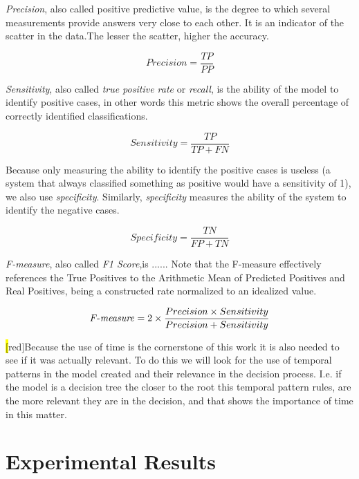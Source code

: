 \emph{Precision}, also called positive predictive value, is the degree to which several measurements provide answers very close to each other. It is an indicator of the scatter in the data.The lesser the scatter, higher the accuracy.

\begin{equation}
Precision= \frac{TP}{PP}
\label{eq:precision}
\end{equation}

\emph{Sensitivity}, also called \emph{true positive rate} or \emph{recall}, is the ability of the model to identify positive cases, in other words this metric shows the overall percentage of correctly identified classifications.

\begin{equation}
Sensitivity= \frac{TP}{TP+FN}
\label{eq:sensitivity}
\end{equation} 

Because only measuring the ability to identify the positive cases is useless (a system that always classified something as positive would have a sensitivity of 1), we also use \emph{specificity}. Similarly, \emph{specificity} measures the ability of the system to identify the negative cases.

\begin{equation}
Specificity= \frac{ TN}{FP+TN}
\label{eq:specificity}
\end{equation}

\emph{F-measure}, also called \emph{F1 Score},is ...... Note that the F-measure effectively references the True Positives to the Arithmetic Mean of Predicted Positives and Real Positives, being a constructed rate normalized to an idealized value.

\begin{equation}
\mathit{F\textnormal{-}measure} = 2 \times \frac{ Precision \times Sensitivity}{Precision + Sensitivity}
\label{eq:fmeasure}
\end{equation}

\hl[red]{Because the use of time is the cornerstone of this work it is also needed to see if it was actually relevant. To do this we will look for the use of temporal patterns in the model created and their relevance in the decision process. I.e. if the model is a decision tree the closer to the root this temporal pattern rules, are the more relevant they are in the decision, and that shows the importance of time in this matter.}

\section{Experimental Results}
\label{section:results}

